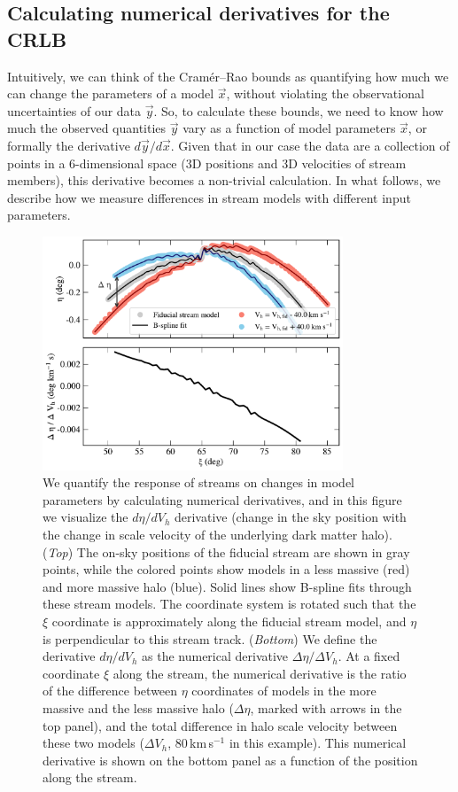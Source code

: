 \documentclass[modern]{aastex62}
\newcommand{\acronym}[1]{{\small{#1}}}
\newcommand{\CRLB}{\acronym{CRLB}}
\begin{document}
\subsection{Calculating numerical derivatives for the \CRLB}
\label{sec:derivatives}
Intuitively, we can think of the Cram\'er--Rao bounds as quantifying how much we can change the parameters of a model $\vec{x}$, without violating the observational uncertainties of our data $\vec{y}$.
So, to calculate these bounds, we need to know how much the observed quantities $\vec{y}$ vary as a function of model parameters $\vec{x}$, or formally the derivative $d\vec{y}/d\vec{x}$.
Given that in our case the data are a collection of points in a 6-dimensional space (3D positions and 3D velocities of stream members), this derivative becomes a non-trivial calculation.
In what follows, we describe how we measure differences in stream models with different input parameters.

\begin{figure}
\begin{center}
\includegraphics[width=0.8\textwidth]{derivative_vis.pdf}
\caption{We quantify the response of streams on changes in model parameters by calculating numerical derivatives, and in this figure we visualize the $d\eta / d V_h$ derivative (change in the sky position with the change in scale velocity of the underlying dark matter halo).
(\emph{Top}) The on-sky positions of the fiducial stream are shown in gray points, while the colored points show models in a less massive (red) and more massive halo (blue).
Solid lines show B-spline fits through these stream models.
The coordinate system is rotated such that the $\xi$ coordinate is approximately along the fiducial stream model, and $\eta$ is perpendicular to this stream track. 
(\emph{Bottom}) We define the derivative $d\eta / d V_h$ as the numerical derivative $\Delta\eta / \Delta V_h$.
At a fixed coordinate $\xi$ along the stream, the numerical derivative is the ratio of the difference between $\eta$ coordinates of models in the more massive and the less massive halo ($\Delta\eta$, marked with arrows in the top panel), and the total difference in halo scale velocity between these two models ($\Delta V_h$, 80\,km\,s$^{-1}$ in this example).
This numerical derivative is shown on the bottom panel as a function of the position along the stream.
}
\label{fig:derivative_steps}
\end{center}
\end{figure}
\end{document}
